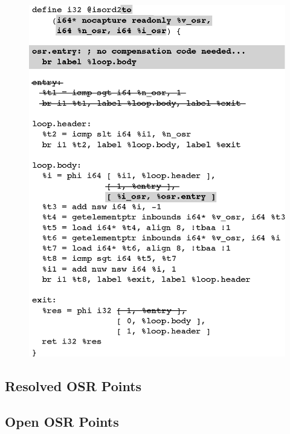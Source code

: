 \ifdefined\noauthorea
\begin{figure}[t]
\begin{center}
\includegraphics[width=0.9\columnwidth]{figures/isord2to/isord2to.eps}
\caption{\protect}
\end{center}
\end{figure}
\fi

\subsection{Resolved OSR Points}

\subsection{Open OSR Points}
  
%
%


  
  
  
  
  